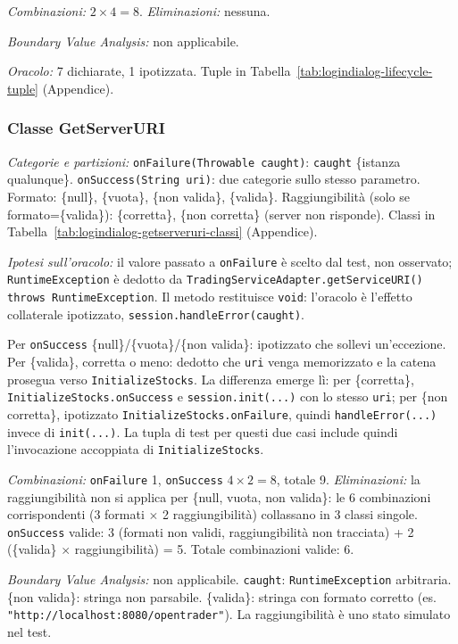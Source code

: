 \textit{Combinazioni:} $2\times4=8$. \textit{Eliminazioni:} nessuna.

\textit{Boundary Value Analysis:} non applicabile.

\textit{Oracolo:} 7 dichiarate, 1 ipotizzata. Tuple in Tabella~\ref{tab:logindialog-lifecycle-tuple}
(Appendice).

\subsubsection{Classe GetServerURI}

\textit{Categorie e partizioni:} \texttt{onFailure(Throwable caught)}: \texttt{caught}
\{istanza qualunque\}. \texttt{onSuccess(String uri)}: due categorie sullo stesso parametro.
Formato: \{null\}, \{vuota\}, \{non valida\}, \{valida\}. Raggiungibilità (solo se
formato=\{valida\}): \{corretta\}, \{non corretta\} (server non risponde). Classi in
Tabella~\ref{tab:logindialog-getserveruri-classi} (Appendice).

\textit{Ipotesi sull'oracolo:} il valore passato a \texttt{onFailure} è scelto dal test, non
osservato; \texttt{RuntimeException} è dedotto da \texttt{TradingServiceAdapter.getServiceURI()
throws RuntimeException}. Il metodo restituisce \texttt{void}: l'oracolo
è l'effetto collaterale ipotizzato, \texttt{session.handleError(caught)}.

Per \texttt{onSuccess} \{null\}/\{vuota\}/\{non valida\}: ipotizzato che sollevi
un'eccezione. Per \{valida\}, corretta o meno:
dedotto che \texttt{uri} venga memorizzato e la catena prosegua verso
\texttt{InitializeStocks}. La differenza emerge lì: per \{corretta\},
\texttt{InitializeStocks.onSuccess} e \texttt{session.init(...)} con lo stesso \texttt{uri}; per \{non corretta\}, ipotizzato \texttt{InitializeStocks.onFailure}, quindi
\texttt{handleError(...)} invece di \texttt{init(...)}. La tupla di test per questi due casi
include quindi l'invocazione accoppiata di \texttt{InitializeStocks}.

\textit{Combinazioni:} \texttt{onFailure} 1, \texttt{onSuccess} $4\times2=8$, totale 9.
\textit{Eliminazioni:} la raggiungibilità non si applica per \{null, vuota, non valida\}: le 6
combinazioni corrispondenti (3 formati $\times$ 2 raggiungibilità) collassano in 3 classi
singole. \texttt{onSuccess} valide: 3 (formati non validi, raggiungibilità non tracciata) + 2
(\{valida\} $\times$ raggiungibilità) = 5. Totale combinazioni valide: 6.

\textit{Boundary Value Analysis:} non applicabile. \texttt{caught}: \texttt{RuntimeException}
arbitraria. \{non valida\}: stringa non parsabile. \{valida\}:
stringa con formato corretto (es. \texttt{"http://localhost:8080/opentrader"}). La
raggiungibilità è uno stato simulato nel test.

